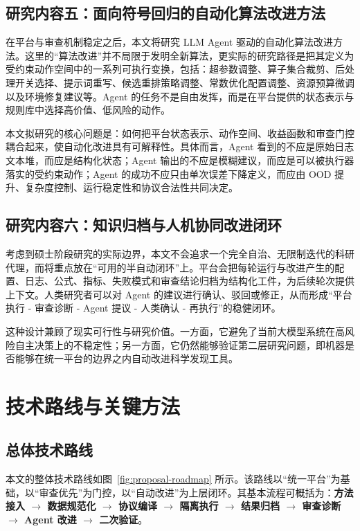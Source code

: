 \documentclass[UTF8,12pt]{ctexart}
\begin{document}
\subsection{研究内容五：面向符号回归的自动化算法改进方法}

在平台与审查机制稳定之后，本文将研究 LLM Agent 驱动的自动化算法改进方法。这里的“算法改进”并不局限于发明全新算法，更实际的研究路径是把其定义为受约束动作空间中的一系列可执行变换，包括：超参数调整、算子集合裁剪、后处理开关选择、提示词重写、候选重排策略调整、常数优化配置调整、资源预算微调以及环境修复建议等。Agent 的任务不是自由发挥，而是在平台提供的状态表示与规则库中选择高价值、低风险的动作。

本文拟研究的核心问题是：如何把平台状态表示、动作空间、收益函数和审查门控耦合起来，使自动化改进具有可解释性。具体而言，Agent 看到的不应是原始日志文本堆，而应是结构化状态；Agent 输出的不应是模糊建议，而应是可以被执行器落实的受约束动作；Agent 的成功不应只由单次误差下降定义，而应由 OOD 提升、复杂度控制、运行稳定性和协议合法性共同决定。

\subsection{研究内容六：知识归档与人机协同改进闭环}

考虑到硕士阶段研究的实际边界，本文不会追求一个完全自治、无限制迭代的科研代理，而将重点放在“可用的半自动闭环”上。平台会把每轮运行与改进产生的配置、日志、公式、指标、失败模式和审查结论归档为结构化工件，为后续轮次提供上下文。人类研究者可以对 Agent 的建议进行确认、驳回或修正，从而形成“平台执行 - 审查诊断 - Agent 提议 - 人类确认 - 再执行”的稳健闭环。

这种设计兼顾了现实可行性与研究价值。一方面，它避免了当前大模型系统在高风险自主决策上的不稳定性；另一方面，它仍然能够验证第二层研究问题，即机器是否能够在统一平台的边界之内自动改进科学发现工具。

\section{技术路线与关键方法}

\subsection{总体技术路线}

本文的整体技术路线如图~\ref{fig:proposal-roadmap} 所示。该路线以“统一平台”为基础，以“审查优先”为门控，以“自动改进”为上层闭环。其基本流程可概括为：\textbf{方法接入 $\rightarrow$ 数据规范化 $\rightarrow$ 协议编译 $\rightarrow$ 隔离执行 $\rightarrow$ 结果归档 $\rightarrow$ 审查诊断 $\rightarrow$ Agent 改进 $\rightarrow$ 二次验证}。
\end{document}
